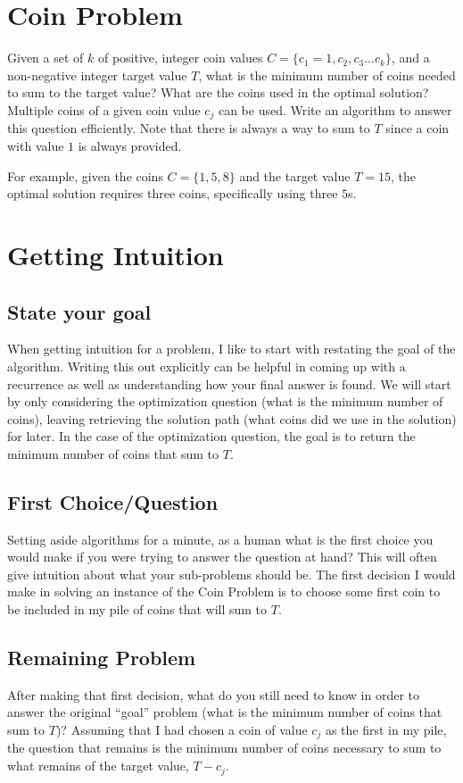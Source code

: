 \documentclass[11pt]{article}
\begin{document}
\section*{Coin Problem}
Given a set of $k$ of positive, integer coin values $C = \{c_1 = 1, c_2, c_3 ... c_k\}$, and a non-negative integer target value $T$, what is the minimum number of coins needed to sum to the target value? What are the coins used in the optimal solution? Multiple coins of a given coin value $c_j$ can be used. Write an algorithm to answer this question efficiently. Note that there is always a way to sum to $T$ since a coin with value $1$ is always provided. 

For example, given the coins $C = \{1, 5, 8\}$ and the target value $T = 15$, the optimal solution requires three coins, specifically using three $5$s.

\section{Getting Intuition}
\subsection*{State your goal}
When getting intuition for a problem, I like to start with restating the goal of the algorithm. Writing this out explicitly can be helpful in coming up with a recurrence as well as understanding how your final answer is found. We will start by only considering the optimization question (what is the minimum number of coins), leaving retrieving the solution path (what coins did we use in the solution) for later. In the case of the optimization question, the goal is to return the minimum number of coins that sum to $T$.

\subsection*{First Choice/Question}
Setting aside algorithms for a minute, as a human what is the first choice you would make if you were trying to answer the question at hand? This will often give intuition about what your sub-problems should be. The first decision I would make in solving an instance of the Coin Problem is to choose some first coin to be included in my pile of coins that will sum to $T$. 

\subsection*{Remaining Problem}
After making that first decision, what do you still need to know in order to answer the original ``goal'' problem (what is the minimum number of coins that sum to $T$)? Assuming that I had chosen a coin of value $c_j$ as the first in my pile, the question that remains is the minimum number of coins necessary to sum to what remains of the target value, $T - c_j$.
\end{document}
